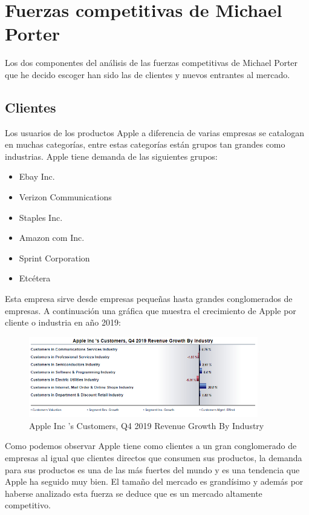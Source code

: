 \documentclass{article}
\begin{document}
\section{Fuerzas competitivas de Michael Porter}
Los dos componentes del análisis de las fuerzas competitivas de Michael Porter que he decido escoger han sido las de clientes y nuevos entrantes al mercado.

\subsection{Clientes}
Los usuarios de los productos Apple a diferencia de varias empresas se catalogan en muchas categorías, entre estas categorías están grupos tan grandes como industrias. Apple tiene demanda de las siguientes grupos:
\begin{itemize}
    \item Ebay Inc. 
    \item Verizon Communications 
    \item Staples Inc. 
    \item Amazon com Inc. 
    \item Sprint Corporation 
    \item Etcétera
\end{itemize}

Esta empresa sirve desde empresas pequeñas hasta grandes conglomerados de empresas. A continuación una gráfica que muestra el crecimiento de Apple por cliente o industria en año 2019: 
\begin{center}
    \begin{figure}[htb]
        \centering
        \includegraphics[width=10cm]{./figs/global.PNG}
        \caption{Apple Inc 's Customers, Q4 2019 Revenue Growth By Industry}
    \end{figure}
\end{center}
Como podemos observar Apple tiene como clientes a un gran conglomerado de empresas al igual que clientes directos que consumen sus productos, la demanda para sus productos es una de las más fuertes del mundo y es una tendencia que Apple ha seguido muy bien. El tamaño del mercado es grandísimo y además por haberse analizado esta fuerza se deduce que es un mercado altamente competitivo.
\end{document}
